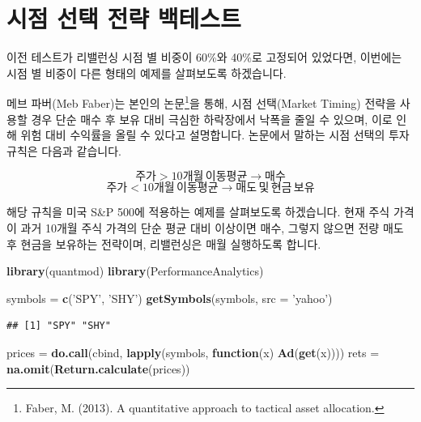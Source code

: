 \documentclass[12pt,]{book}
\newenvironment{Shaded}{\begin{snugshade}}{\end{snugshade}}
\newcommand{\ControlFlowTok}[1]{\textcolor[rgb]{0.13,0.29,0.53}{\textbf{#1}}}
\newcommand{\DataTypeTok}[1]{\textcolor[rgb]{0.13,0.29,0.53}{#1}}
\newcommand{\KeywordTok}[1]{\textcolor[rgb]{0.13,0.29,0.53}{\textbf{#1}}}
\newcommand{\NormalTok}[1]{#1}
\newcommand{\StringTok}[1]{\textcolor[rgb]{0.31,0.60,0.02}{#1}}
\let\rmarkdownfootnote\footnote%
\def\footnote{\protect\rmarkdownfootnote}
\begin{document}
\hypertarget{section-83}{%
\section{시점 선택 전략 백테스트}\label{section-83}}

이전 테스트가 리밸런싱 시점 별 비중이 60\%와 40\%로 고정되어 있었다면, 이번에는 시점 별 비중이 다른 형태의 예제를 살펴보도록 하겠습니다.

메브 파버(Meb Faber)는 본인의 논문\footnote{Faber, M. (2013). A quantitative approach to tactical asset allocation.}을 통해, 시점 선택(Market Timing) 전략을 사용할 경우 단순 매수 후 보유 대비 극심한 하락장에서 낙폭을 줄일 수 있으며, 이로 인해 위험 대비 수익률을 올릴 수 있다고 설명합니다. 논문에서 말하는 시점 선택의 투자 규칙은 다음과 같습니다.

\[주가 > 10개월\,이동평균 \to 매수\]
\[주가 < 10개월\,이동평균 \to 매도\,및\,현금\,보유\]

해당 규칙을 미국 S\&P 500에 적용하는 예제를 살펴보도록 하겠습니다. 현재 주식 가격이 과거 10개월 주식 가격의 단순 평균 대비 이상이면 매수, 그렇지 않으면 전량 매도 후 현금을 보유하는 전략이며, 리밸런싱은 매월 실행하도록 합니다.

\begin{Shaded}
\begin{Highlighting}[]
\KeywordTok{library}\NormalTok{(quantmod)}
\KeywordTok{library}\NormalTok{(PerformanceAnalytics)}

\NormalTok{symbols =}\StringTok{ }\KeywordTok{c}\NormalTok{(}\StringTok{'SPY'}\NormalTok{, }\StringTok{'SHY'}\NormalTok{)}
\KeywordTok{getSymbols}\NormalTok{(symbols, }\DataTypeTok{src =} \StringTok{'yahoo'}\NormalTok{)}
\end{Highlighting}
\end{Shaded}

\begin{verbatim}
## [1] "SPY" "SHY"
\end{verbatim}

\begin{Shaded}
\begin{Highlighting}[]
\NormalTok{prices =}\StringTok{ }\KeywordTok{do.call}\NormalTok{(cbind,}
                 \KeywordTok{lapply}\NormalTok{(symbols, }\ControlFlowTok{function}\NormalTok{(x) }\KeywordTok{Ad}\NormalTok{(}\KeywordTok{get}\NormalTok{(x))))}
\NormalTok{rets =}\StringTok{ }\KeywordTok{na.omit}\NormalTok{(}\KeywordTok{Return.calculate}\NormalTok{(prices))}
\end{Highlighting}
\end{Shaded}
\end{document}
